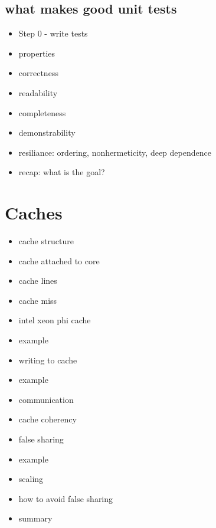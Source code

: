 \documentclass[8pt,a4paper,fleqn]{article}
\begin{document}
\begin{multicols}{2}
  \subsection{what makes good unit tests} %
  \label{sub:what_makes_good_unit_tests}
  \begin{itemize}
    \item Step 0 - write tests
    \item properties
    \item correctness
    \item readability
    \item completeness
    \item demonstrability
    \item resiliance: ordering, nonhermeticity, deep dependence
    \item recap: what is the goal?
  \end{itemize}

  \section{Caches} %
  \label{sec:caches}
  \begin{itemize}
    \item cache structure
    \item cache attached to core
    \item cache lines
    \item cache miss
    \item intel xeon phi cache
    \item example
    \item writing to cache
    \item example
    \item communication
    \item cache coherency
    \item false sharing
    \item example
    \item scaling
    \item how to avoid false sharing
    \item summary
  \end{itemize}


\end{multicols}
\end{document}
